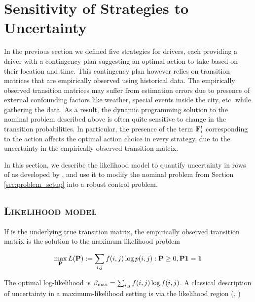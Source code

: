 
\section{Sensitivity of Strategies to Uncertainty}
\label{sec:sensitivity}

In the previous section we defined five strategies for drivers, each providing a driver with a contingency plan suggesting an optimal action to take based on their location and time. This contingency plan however relies on transition matrices {\empiricaltransitionmatrix} that are empirically observed using historical data. The empirically observed transition matrices may suffer from estimation errors due to presence of external confounding factors like weather, special events inside the city, etc. while gathering the data. As a result, the dynamic programming solution to the nominal problem described above is often quite sensitive to change in the transition probabilities. In particular, the presence of the term ${\mathbf{F}}_{i}^{t}$ corresponding to the {\getpassenger} action affects the optimal action choice in every strategy, due to the uncertainty in the empirically observed transition matrix.

In this section, we describe the likelihood model to quantify uncertainty in rows of {\empiricaltransitionmatrix} as developed by \citet{nilim2004robustness}, and use it to modify the nominal problem from Section \ref{sec:problem_setup} into a robust control problem.

\subsection{\textsc{Likelihood model}}
\label{sec:likelihood_model}

If {\truetransitionmatrix} is the underlying true transition matrix, the empirically observed transition matrix {\empiricaltransitionmatrix} is the solution to the maximum likelihood problem

\begin{equation}
\max_{\mathbf{P}} L({\mathbf{P}}) := \sum_{i,j}f(i,j) \log{p(i,j)} : {\mathbf{P}} \geq 0, {\mathbf{P}}\mathbf{1} = \mathbf{1} 
\end{equation}

The optimal log-likelihood is $\beta_{\textrm{max}}= \sum_{i,j}f(i,j)\log{f(i,j)}$.
A classical description of uncertainty in a maximum-likelihood setting is via the likelihood region (\citet{lehmann2006theory}, \citet{poor2013introduction})

